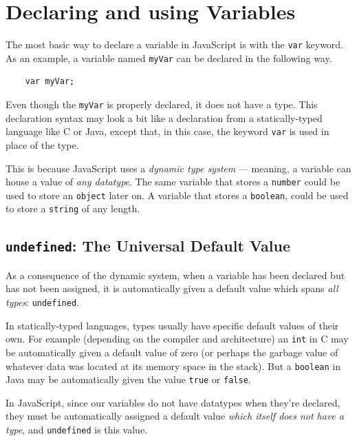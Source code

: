 \documentclass[11pt,letter]{book}
\begin{document}
    \section{Declaring and using Variables}
    The most basic way to declare a variable in JavaScript is with the \texttt{var} keyword. As an 
    example, a variable named \texttt{myVar} can be declared in the following way.
    
    \begin{verbatim}
    var myVar;
    \end{verbatim}
    
    Even though the \texttt{myVar} is properly declared, it does not have a type. This declaration 
    syntax may look a bit like a declaration from a statically-typed language like C or Java, except
    that, in this case, the keyword \texttt{var} is used in place of the type.
    
    This is because JavaScript uses a \emph{dynamic type system} --- meaning, a variable can house a 
    value of \emph{any datatype}. The same variable that stores a \texttt{number} could be used to 
    store an \texttt{object} later on. A variable that stores a \texttt{boolean}, could be used to 
    store a \texttt{string} of any length.
    
    \subsection{\texttt{undefined}: The Universal Default Value}
    
    As a consequence of the dynamic system, when a variable has been declared but has not been 
    assigned, it is automatically given a default value which spans \emph{all types}: 
    \texttt{undefined}.
    
    In statically-typed languages, types usually have specific default values of their own. For 
    example (depending on the compiler and architecture) an \texttt{int} in C may be automatically
    given a default value of zero (or perhaps the garbage value of whatever data was located at its 
    memory space in the stack). But a \texttt{boolean} in Java may be automatically given the value 
    \texttt{true} or \texttt{false}.
    
    In JavaScript, since our variables do not have datatypes when they're declared, they must be 
    automatically assigned a default value \emph{which itself does not have a type}, and 
    \texttt{undefined} is this value.
    
\end{document}
